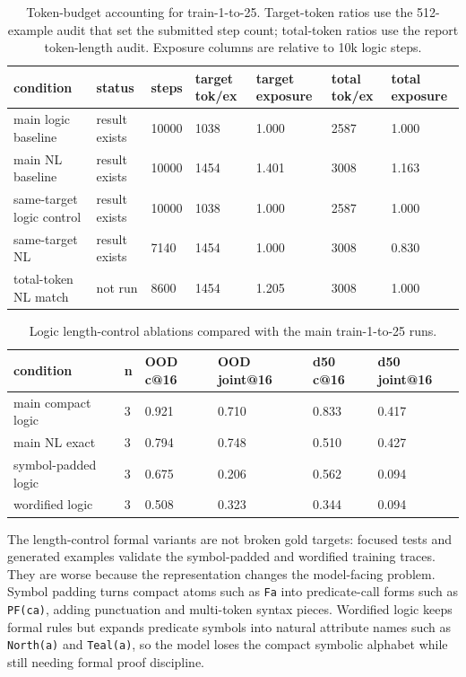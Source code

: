 \documentclass[10pt]{article}
\begin{document}
\begin{table}[H]
\centering
\small
\begin{tabular}{lllllll}
\toprule
condition & status & steps & target tok/ex & target exposure & total tok/ex & total exposure \\
\midrule
main logic baseline & result exists & 10000 & 1038 & 1.000 & 2587 & 1.000 \\
main NL baseline & result exists & 10000 & 1454 & 1.401 & 3008 & 1.163 \\
same-target logic control & result exists & 10000 & 1038 & 1.000 & 2587 & 1.000 \\
same-target NL & result exists & 7140 & 1454 & 1.000 & 3008 & 0.830 \\
total-token NL match & not run & 8600 & 1454 & 1.205 & 3008 & 1.000 \\
\bottomrule
\end{tabular}
\caption{Token-budget accounting for train-1-to-25. Target-token ratios use the 512-example audit that set the submitted step count; total-token ratios use the report token-length audit. Exposure columns are relative to 10k logic steps.}
\end{table}

\begin{table}[H]
\centering
\small
\begin{tabular}{llllll}
\toprule
condition & n & OOD c@16 & OOD joint@16 & d50 c@16 & d50 joint@16 \\
\midrule
main compact logic & 3 & 0.921 & 0.710 & 0.833 & 0.417 \\
main NL exact & 3 & 0.794 & 0.748 & 0.510 & 0.427 \\
symbol-padded logic & 3 & 0.675 & 0.206 & 0.562 & 0.094 \\
wordified logic & 3 & 0.508 & 0.323 & 0.344 & 0.094 \\
\bottomrule
\end{tabular}
\caption{Logic length-control ablations compared with the main train-1-to-25 runs.}
\end{table}

The length-control formal variants are not broken gold targets: focused tests and generated examples validate the symbol-padded and wordified training traces. They are worse because the representation changes the model-facing problem. Symbol padding turns compact atoms such as \texttt{Fa} into predicate-call forms such as \texttt{PF(ca)}, adding punctuation and multi-token syntax pieces. Wordified logic keeps formal rules but expands predicate symbols into natural attribute names such as \texttt{North(a)} and \texttt{Teal(a)}, so the model loses the compact symbolic alphabet while still needing formal proof discipline.
\end{document}

